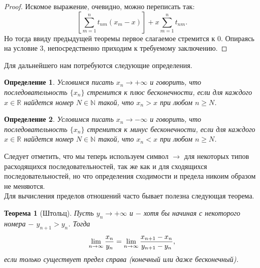 \documentclass{article}
\newtheorem{theorem}{Теорема}[section]
\newtheorem{definition}{Определение}[section]
\begin{document}
\begin{proof}
Искомое выражение, очевидно, можно переписать так:
\[
\left[\sum\limits_{m = 1}^{n} {t_{nm}(x_m - x)}\right] + x\sum\limits_{m = 1}^{n} {t_{nm}}.
\]
Но тогда ввиду предыдущей теоремы первое слагаемое стремится к \(0\). Опираясь на условие \(\textit{3}\), непосредственно приходим к требуемому заключению.
\end{proof}

Для дальнейшего нам потребуются следующие определения.

\begin{definition}
Условимся писать \(x_n \to + \infty\) и говорить, что последовательность \(\{x_n\}\) стремится к плюс бесконечности, если для каждого \(x \in \mathbb{R}\) найдется номер \(N \in \mathbb{N}\) такой, что \(x_n > x\) при любом \(n \geq N\).
\end{definition}

\begin{definition}
Условимся писать \(x_n \to - \infty\) и говорить, что последовательность \(\{x_n\}\) стремится к минус бесконечности, если для каждого \(x \in \mathbb{R}\) найдется номер \(N \in \mathbb{N}\) такой, что \(x_n < x\) при любом \(n \geq N\).
\end{definition}

Следует отметить, что мы теперь используем символ \(\to\) для некоторых типов расходящихся последовательностей, так же как и для сходящихся последовательностей, но что определения сходимости и предела никоим образом не меняются.
\\

Для вычисления пределов отношений часто бывает полезна следующая теорема.

\begin{theorem}[Штольц]
Пусть \(y_n \to + \infty\) и \(-\) хотя бы начиная с некоторого номера \(-\) \(y_{n + 1} > y_n\). Тогда
\[
\lim\limits_{n \to \infty}{x_n \over y_n} = \lim\limits_{n \to \infty}{{x_{n + 1} - x_{n}} \over {y_{n + 1} - y_{n}}},
\]
если только существует предел справа (конечный или даже бесконечный).
\end{theorem}
\end{document}
